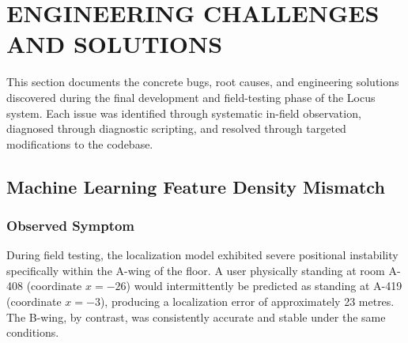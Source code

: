 \documentclass[11pt,a4paper]{article}
\begin{document}
\section{ENGINEERING CHALLENGES AND SOLUTIONS}
This section documents the concrete bugs, root causes, and engineering solutions discovered during the final development and field-testing phase of the Locus system. Each issue was identified through systematic in-field observation, diagnosed through diagnostic scripting, and resolved through targeted modifications to the codebase.
\subsection{Machine Learning Feature Density Mismatch}
\subsubsection{Observed Symptom}
During field testing, the localization model exhibited severe positional instability specifically within the A-wing of the floor. A user physically standing at room A-408 (coordinate $x = -26$) would intermittently be predicted as standing at A-419 (coordinate $x = -3$), producing a localization error of approximately 23 metres. The B-wing, by contrast, was consistently accurate and stable under the same conditions.
\end{document}
